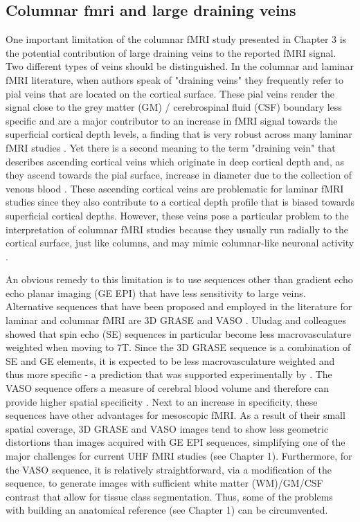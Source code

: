 \subsection{Columnar fmri and large draining veins}
One important limitation of the columnar fMRI study presented in Chapter 3 is the potential contribution of large draining veins to the reported fMRI signal. Two different types of veins should be distinguished. In the columnar and laminar fMRI literature, when authors speak of "draining veins" they frequently refer to pial veins that are located on the cortical surface. These pial veins render the signal close to the grey matter (GM) / cerebrospinal fluid (CSF) boundary less specific \parencite{Polimeni2010, Moerel2017} and are a major contributor to an increase in fMRI signal towards the superficial cortical depth levels, a finding that is very robust across many laminar fMRI studies \parencite{Ress2007, Koopmans2010, Polimeni2010, Koopmans2011, DeMartino2013, Marquardt2018}. Yet there is a second meaning to the term "draining vein" that describes ascending cortical veins which originate in deep cortical depth and, as they ascend towards the pial surface, increase in diameter due to the collection of venous blood \parencite{Duvernoy1981}. These ascending cortical veins are problematic for laminar fMRI studies since they also contribute to a cortical depth profile that is biased towards superficial cortical depths. However, these veins pose a particular problem to the interpretation of columnar fMRI studies because they usually run radially to the cortical surface, just like columns, and may mimic columnar-like neuronal activity \parencite{DeMartino2016}.

An obvious remedy to this limitation is to use sequences other than gradient echo echo planar imaging (GE EPI) that have less sensitivity to large veins. Alternative sequences that have been proposed and employed in the literature for laminar and columnar fMRI are 3D GRASE \parencite{Feinberg2008, Zimmermann2011, DeMartino2013, Kemper2015, Moerel2017} and VASO \parencite{Huber2015, Huber2017}. Uludag and colleagues \parencite*{Uludag2009} showed that spin echo (SE) sequences in particular become less macrovasculature weighted when moving to 7T. Since the 3D GRASE sequence is a combination of SE and GE elements, it is expected to be less macrovasculature weighted and thus more specific - a prediction that was supported experimentally by \cite{DeMartino2013}. The VASO sequence offers a measure of cerebral blood volume and therefore can provide higher spatial specificity \parencite{Huber2015, Huber2017}. Next to an increase in specificity, these sequences have other advantages for mesoscopic fMRI. As a result of their small spatial coverage, 3D GRASE and VASO images tend to show less geometric distortions than images acquired with GE EPI sequences, simplifying one of the major challenges for current UHF fMRI studies (see Chapter 1). Furthermore, for the VASO sequence, it is relatively straightforward, via a modification of the sequence, to generate images with sufficient white matter (WM)/GM/CSF contrast that allow for tissue class segmentation. Thus, some of the problems with building an anatomical reference (see Chapter 1) can be circumvented.

